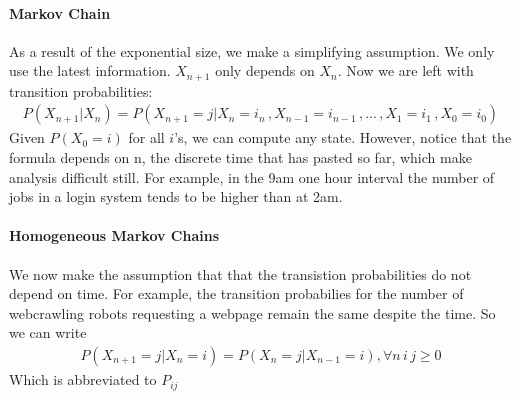\paragraph{Markov Chain} As a result of the exponential size, we make a
simplifying assumption. We only use the latest information. $X_{n+1}$ only
depends on $X_n$. Now we are left with transition probabilities:
\begin{equation*} \begin{split}
	P(X_{n+1} | X_n) = P(X_{n+1} = j | X_n = i_n\, , X_{n-1} = i_{n-1}\, , ... \, , X_1 = i_1\, ,X_0 = i_0)
\end{split} \end{equation*}
Given $P(X_0 = i)$ for all $i$'s, we can compute any state. However, notice that
the formula depends on n, the discrete time that has pasted so far, which make
analysis difficult still. For example, in the 9am one hour interval the number
of jobs in a login system tends to be higher than at 2am.

\paragraph{Homogeneous Markov Chains} We now make the assumption that that the
transistion probabilities do not depend on time. For example, the transition
probabilies for the number of webcrawling robots requesting a webpage remain the
same despite the time. So we can write
\begin{equation*} \begin{split}
	P(X_{n+1} = j | X_n = i ) = P(X_{n} =j | X_{n-1} = i ), \forall n\,i\,j \ge 0
\end{split} \end{equation*}
Which is abbreviated to $P_{ij}$






\begin{equation*} \begin{split}
\end{split} \end{equation*}












